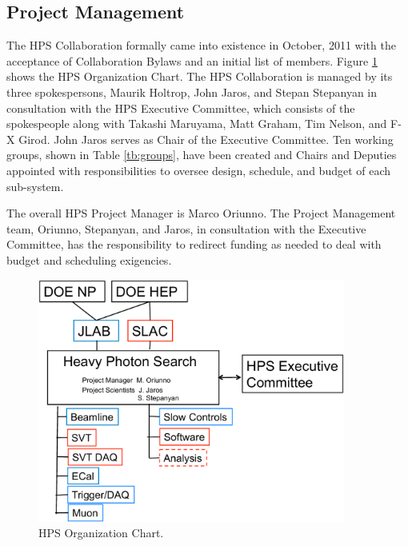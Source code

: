\subsection{Project Management}

The HPS Collaboration formally came into existence in October, 2011 with the acceptance of Collaboration Bylaws and an initial list of members.
Figure \ref{fig:org_chart} shows the HPS Organization Chart. The HPS Collaboration is managed by its three spokespersons, Maurik Holtrop, John Jaros, and 
Stepan Stepanyan in consultation with the HPS Executive Committee, 
which consists of the spokespeople along with Takashi Maruyama, Matt Graham, Tim Nelson, and F-X Girod. John Jaros serves as Chair of the Executive Committee. 
Ten working groups, shown in Table \ref{tb:groups}, have been created and Chairs and Deputies appointed with responsibilities 
to oversee design, schedule, and budget of each sub-system. 

The overall HPS Project Manager is Marco Oriunno. The Project Management team, Oriunno, Stepanyan, and Jaros,
in consultation with the Executive Committee, has the responsibility to redirect funding as needed to deal with budget and scheduling exigencies.

\begin{figure}[ht]
\centering
\includegraphics[width=0.9\textwidth]{cost_schedule/org_chart} 
\caption{HPS Organization Chart.}
\label{fig:org_chart}
\end{figure}



